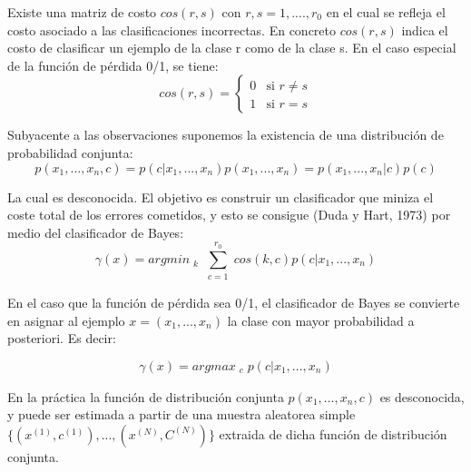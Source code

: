 	Existe una matriz de costo \begin{math} cos(r, s)\end{math} con \begin{math} r, s = 1, ...., r_{0}\end{math} en el cual se refleja el costo asociado a las clasificaciones incorrectas. En concreto \begin{math} cos(r, s) \end{math} indica el costo de clasificar un ejemplo de la clase r como de la clase s. En el caso especial de la función de pérdida 0/1, se tiene:\\

	\[ cos(r, s) = \left \{ \begin{matrix} 0 & \mbox{si }r \ne s
\\ 1 & \mbox{si }r = s \end{matrix}\right. \]

	Subyacente a las observaciones suponemos la existencia de una distribución de probabilidad conjunta:\\

	\[
		p(x_{1}, ..., x_{n}, c) = p(c | x_{1}, ..., x_{n})p(x_{1}, ..., x_{n}) = p(x_{1}, ..., x_{n}|c)p(c)
	\]

	La cual es desconocida. El objetivo es construir un clasificador que miniza el coste total de los errores cometidos, y esto se consigue (Duda y Hart, 1973) por medio del clasificador de Bayes:\\

	\[
		\gamma(x) = arg min_{\substack{k}} \sum^{r_{0}}_{\substack{c = 1}} cos(k,c)p(c | x_{1}, ..., x_{n})
	\]

	En el caso que la función de pérdida sea 0/1, el clasificador de Bayes se convierte en asignar al ejemplo \begin{math} x = (x_{1}, ..., x_{n})\end{math} la clase con mayor probabilidad a posteriori. Es decir:

	\[
		\gamma(x) = arg max_{\substack{c}} p(c | x_{1}, ..., x_{n})
	\]

	En la práctica la función de distribución conjunta \begin{math} p(x_{1}, ..., x_{n}, c) \end{math} es desconocida, y puede ser estimada a partir de una muestra aleatorea simple \begin{math} \{ (x^{(1)}, c^{(1)} ), ..., (x^{(N)}, C^{(N)})\}\end{math} extraida de dicha función de distribución conjunta.\\

